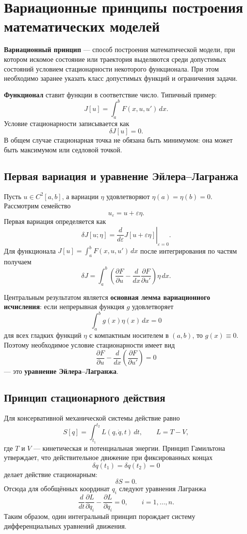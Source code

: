 \section{Вариационные принципы построения математических моделей}
\label{sec:variational-principles-of-modeling}

\textbf{Вариационный принцип} --- способ построения математической модели,
при котором искомое состояние или траектория выделяются среди допустимых
состояний условием стационарности некоторого функционала. При этом
необходимо заранее указать класс допустимых функций и ограничения задачи.

\textbf{Функционал} ставит функции в соответствие число. Типичный пример:
\[
J[u]=\int_a^b F(x,u,u')\,dx.
\]
Условие стационарности записывается как
\[
\boxed{\delta J[u]=0}.
\]
В общем случае стационарная точка не обязана быть минимумом: она может быть
максимумом или седловой точкой.

\subsection{Первая вариация и уравнение Эйлера--Лагранжа}

Пусть $u\in C^2[a,b]$, а вариации $\eta$ удовлетворяют
$\eta(a)=\eta(b)=0$. Рассмотрим семейство
\[
u_\varepsilon=u+\varepsilon\eta.
\]
Первая вариация определяется как
\[
\delta J[u;\eta]
=\left.\frac{d}{d\varepsilon}J[u+\varepsilon\eta]\right|_{\varepsilon=0}.
\]
Для функционала $J[u]=\int_a^b F(x,u,u')\,dx$ после интегрирования по частям
получаем
\[
\delta J
=\int_a^b
\left(
\frac{\partial F}{\partial u}
-\frac{d}{dx}\frac{\partial F}{\partial u'}
\right)\eta\,dx.
\]

Центральным результатом является \textbf{основная лемма вариационного
исчисления}: если непрерывная функция $g$ удовлетворяет
\[
\int_a^b g(x)\eta(x)\,dx=0
\]
для всех гладких функций $\eta$ с компактным носителем в $(a,b)$, то
$g(x)\equiv0$. Поэтому необходимое условие стационарности имеет вид
\[
\boxed{
\frac{\partial F}{\partial u}
-\frac{d}{dx}\left(\frac{\partial F}{\partial u'}\right)=0
}
\]
--- это \textbf{уравнение Эйлера--Лагранжа}.

\subsection{Принцип стационарного действия}

Для консервативной механической системы действие равно
\[
\boxed{S[q]=\int_{t_1}^{t_2}L(q,\dot q,t)\,dt},
\qquad L=T-V,
\]
где $T$ и $V$ --- кинетическая и потенциальная энергии. Принцип Гамильтона
утверждает, что действительное движение при фиксированных концах
\[
\delta q(t_1)=\delta q(t_2)=0
\]
делает действие стационарным:
\[
\boxed{\delta S=0}.
\]
Отсюда для обобщённых координат $q_i$ следуют уравнения Лагранжа
\[
\boxed{
\frac{d}{dt}\frac{\partial L}{\partial\dot q_i}
-\frac{\partial L}{\partial q_i}=0,
\qquad i=1,\ldots,n.
}
\]
Таким образом, один интегральный принцип порождает систему
дифференциальных уравнений движения.

